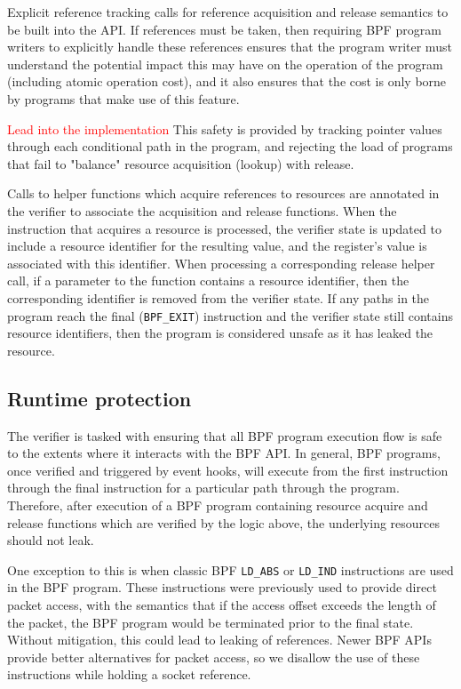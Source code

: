 \documentclass[10pt,sigconf,authorversion]{lpc}
\newcommand\todo[1]{\textcolor{red}{#1}}
\begin{document}
Explicit reference tracking calls for reference acquisition and release
semantics to be built into the API. If references must be taken, then requiring
BPF program writers to explicitly handle these references ensures that the
program writer must understand the potential impact this may have on the
operation of the program (including atomic operation cost), and it also ensures
that the cost is only borne by programs that make use of this feature.

\todo{Lead into the implementation} This safety is provided by tracking pointer
values through each conditional path in the program, and rejecting the load of
programs that fail to "balance" resource acquisition (lookup) with release.

Calls to helper functions which acquire references to resources are annotated
in the verifier to associate the acquisition and release functions. When the
instruction that acquires a resource is processed, the verifier state is
updated to include a resource identifier for the resulting value, and the
register's value is associated with this identifier. When processing a
corresponding release helper call, if a parameter to the function contains a
resource identifier, then the corresponding identifier is removed from the
verifier state. If any paths in the program reach the final (\verb+BPF_EXIT+)
instruction and the verifier state still contains resource identifiers, then
the program is considered unsafe as it has leaked the resource.

\subsection{Runtime protection}

The verifier is tasked with ensuring that all BPF program execution flow is
safe to the extents where it interacts with the BPF API. In general, BPF
programs, once verified and triggered by event hooks, will execute from the
first instruction through the final instruction for a particular path through
the program. Therefore, after execution of a BPF program containing resource
acquire and release functions which are verified by the logic above, the
underlying resources should not leak.

One exception to this is when classic BPF \verb+LD_ABS+ or \verb+LD_IND+
instructions are used in the BPF program. These instructions were previously
used to provide direct packet access, with the semantics that if the access
offset exceeds the length of the packet, the BPF program would be terminated
prior to the final state. Without mitigation, this could lead to leaking of
references. Newer BPF APIs provide better alternatives for packet access, so we
disallow the use of these instructions while holding a socket reference.
\end{document}
